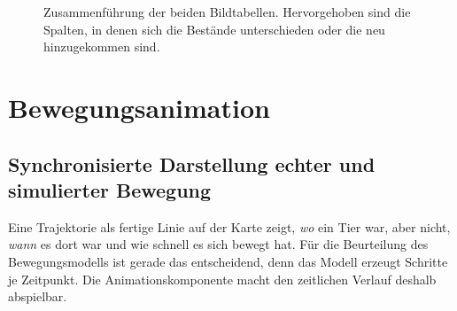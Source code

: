 \documentclass[12pt,a4paper]{report}
\begin{document}
\begin{figure}[htbp]
\caption{Zusammenführung der beiden Bildtabellen. Hervorgehoben sind die
Spalten, in denen sich die Bestände unterschieden oder die neu hinzugekommen
sind.}
\label{fig:datenhaltung}
\end{figure}



\section{Bewegungsanimation}
\label{sec:animation}

\subsection{Synchronisierte Darstellung echter und simulierter Bewegung}
\label{subsec:synchron}

Eine Trajektorie als fertige Linie auf der Karte zeigt, \emph{wo} ein Tier war, aber nicht,
\emph{wann} es dort war und wie schnell es sich bewegt hat. Für die Beurteilung des
Bewegungsmodells ist gerade das entscheidend, denn das Modell erzeugt Schritte je Zeitpunkt.
Die Animationskomponente macht den zeitlichen Verlauf deshalb abspielbar.
\end{document}
